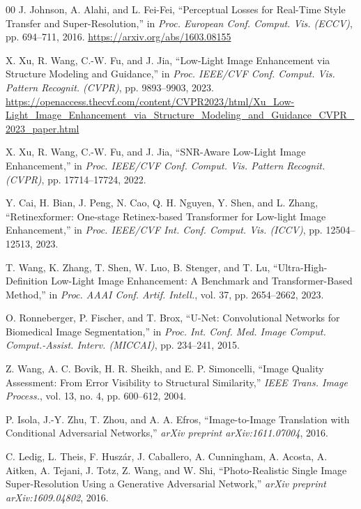 \documentclass[conference]{IEEEtran}
\begin{document}
\begin{thebibliography}{00}
J. Johnson, A. Alahi, and L. Fei-Fei, ``Perceptual Losses for Real-Time Style Transfer and Super-Resolution,'' in \textit{Proc. European Conf. Comput. Vis. (ECCV)}, pp. 694--711, 2016. \url{https://arxiv.org/abs/1603.08155}

X. Xu, R. Wang, C.-W. Fu, and J. Jia, ``Low-Light Image Enhancement via Structure Modeling and Guidance,'' in \textit{Proc. IEEE/CVF Conf. Comput. Vis. Pattern Recognit. (CVPR)}, pp. 9893--9903, 2023. \url{https://openaccess.thecvf.com/content/CVPR2023/html/Xu_Low-Light_Image_Enhancement_via_Structure_Modeling_and_Guidance_CVPR_2023_paper.html}

X. Xu, R. Wang, C.-W. Fu, and J. Jia, ``SNR-Aware Low-Light Image Enhancement,'' in \textit{Proc. IEEE/CVF Conf. Comput. Vis. Pattern Recognit. (CVPR)}, pp. 17714--17724, 2022.

Y. Cai, H. Bian, J. Peng, N. Cao, Q. H. Nguyen, Y. Shen, and L. Zhang, ``Retinexformer: One-stage Retinex-based Transformer for Low-light Image Enhancement,'' in \textit{Proc. IEEE/CVF Int. Conf. Comput. Vis. (ICCV)}, pp. 12504--12513, 2023.

T. Wang, K. Zhang, T. Shen, W. Luo, B. Stenger, and T. Lu, ``Ultra-High-Definition Low-Light Image Enhancement: A Benchmark and Transformer-Based Method,'' in \textit{Proc. AAAI Conf. Artif. Intell.}, vol. 37, pp. 2654--2662, 2023.

O. Ronneberger, P. Fischer, and T. Brox, ``U-Net: Convolutional Networks for Biomedical Image Segmentation,'' in \textit{Proc. Int. Conf. Med. Image Comput. Comput.-Assist. Interv. (MICCAI)}, pp. 234--241, 2015.

Z. Wang, A. C. Bovik, H. R. Sheikh, and E. P. Simoncelli, ``Image Quality Assessment: From Error Visibility to Structural Similarity,'' \textit{IEEE Trans. Image Process.}, vol. 13, no. 4, pp. 600--612, 2004.

P. Isola, J.-Y. Zhu, T. Zhou, and A. A. Efros, ``Image-to-Image Translation with Conditional Adversarial Networks,'' \textit{arXiv preprint arXiv:1611.07004}, 2016.

C. Ledig, L. Theis, F. Husz{\'a}r, J. Caballero, A. Cunningham, A. Acosta, A. Aitken, A. Tejani, J. Totz, Z. Wang, and W. Shi, ``Photo-Realistic Single Image Super-Resolution Using a Generative Adversarial Network,'' \textit{arXiv preprint arXiv:1609.04802}, 2016.


\end{thebibliography}
\end{document}
